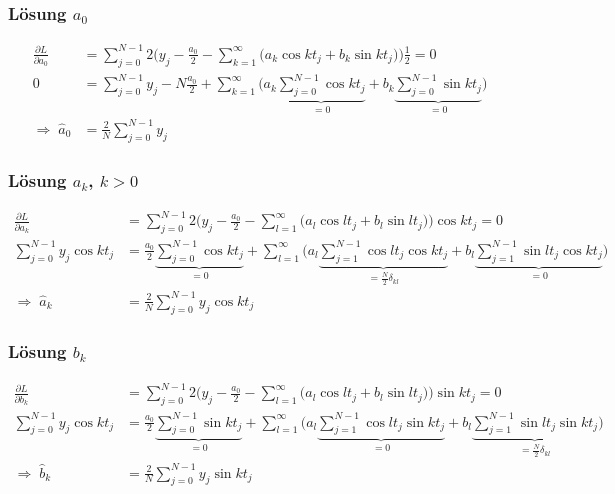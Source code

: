 %
%
\begin{frame}
\frametitle{Lösung $a_0$}
\begin{align*}
\frac{\partial L}{\partial a_0}
&=
\sum_{j=0}^{N-1} 2\biggl(y_j-\frac{a_0}2-\sum_{k=1}^\infty
\bigl(a_k\cos kt_j + b_k\sin kt_j\bigr)
\biggr)\frac12=0
\\
0
&=
\sum_{j=0}^{N-1} y_j - N\frac{a_0}{2} 
+\sum_{k=1}^\infty\biggl(
a_k\underbrace{\sum_{j=0}^{N-1}\cos kt_j}_{\displaystyle=0}
+
b_k\underbrace{\sum_{j=0}^{N-1}\sin kt_j}_{\displaystyle=0}
\biggr)
\\
\Rightarrow\;
\hat a_0&=\frac{2}{N}\sum_{j=0}^{N-1} y_j
\end{align*}
\end{frame}

%
%
\begin{frame}
\frametitle{Lösung $a_k$, $k>0$}
\begin{align*}
\frac{\partial L}{\partial a_k}
&=
\sum_{j=0}^{N-1} 2\biggl(y_j-\frac{a_0}2-\sum_{l=1}^\infty
\bigl(a_l\cos lt_j + b_l\sin lt_j\bigr)
\biggr)\cos kt_j=0
\\
\sum_{j=0}^{N-1}y_j\cos kt_j
&=
\frac{a_0}{2}\underbrace{\sum_{j=0}^{N-1}\cos kt_j}_{\displaystyle=0}
+
\sum_{l=1}^\infty
\biggl(
a_l
\underbrace{
\sum_{j=1}^{N-1}
\cos lt_j
\cos kt_j
}_{\displaystyle=\frac{N}{2}\delta_{kl}}
+
b_l
\underbrace{
\sum_{j=1}^{N-1}
\sin lt_j
\cos kt_j
}_{\displaystyle=0}
\biggr)
\\
\Rightarrow\;
\hat a_k&=\frac{2}{N}\sum_{j=0}^{N-1}y_j\cos kt_j
\end{align*}
\end{frame}

%
%
\begin{frame}
\frametitle{Lösung $b_k$}
\begin{align*}
\frac{\partial L}{\partial b_k}
&=
\sum_{j=0}^{N-1} 2\biggl(y_j-\frac{a_0}2-\sum_{l=1}^\infty
\bigl(a_l\cos lt_j + b_l\sin lt_j\bigr)
\biggr)\sin kt_j=0
\\
\sum_{j=0}^{N-1}y_j\cos kt_j
&=
\frac{a_0}{2}\underbrace{\sum_{j=0}^{N-1}\sin kt_j}_{\displaystyle=0}
+
\sum_{l=1}^\infty
\biggl(
a_l
\underbrace{
\sum_{j=1}^{N-1}
\cos lt_j
\sin kt_j
}_{\displaystyle=0}
+
b_l
\underbrace{
\sum_{j=1}^{N-1}
\sin lt_j
\sin kt_j
}_{\displaystyle=\frac{N}{2}\delta_{kl}}
\biggr)
\\
\Rightarrow\;
\hat b_k&=\frac{2}{N}\sum_{j=0}^{N-1}y_j\sin kt_j
\end{align*}
\end{frame}


